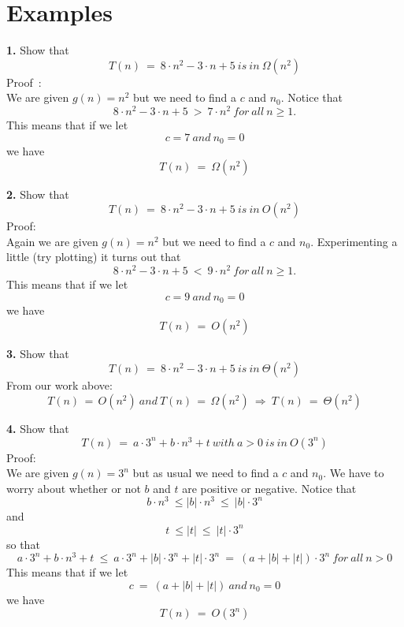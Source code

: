 
{\chapter{Examples}}




{\bf{1.}} Show that
\[
T(n) \ = \ 8{\cdot}n^2 - 3{\cdot}n + 5 \ {\mathit{is\ in}} \ \Omega(n^2)
\]
%
Proof~\cite{book-full}: \\
We are given $g(n) = n^2$ but we need to find a $c$ and $n_0$. Notice that
\[
8{\cdot}n^2 - 3{\cdot}n + 5 \ > \ 7{\cdot}n^2 \ {\mathit{for\ all}} \ n \ge 1.
\]
This means that if we let
\[
c = 7 \ {\mathit{and}} \ n_0 = 0
\]
we have
\[
T(n) \ = \ \Omega(n^2)
\]



\vspace*{2em}


{\bf{2.}} Show that
\[
T(n) \ = \ 8{\cdot}n^2 - 3{\cdot}n + 5 \ {\mathit{is\ in}} \ O(n^2)
\]
%
Proof: \\
Again we are given $g(n) = n^2$ but we need to find a $c$ and $n_0$.
Experimenting a little (try plotting) it turns out that
\[
8{\cdot}n^2 - 3{\cdot}n + 5 \ < \ 9{\cdot}n^2 \ {\mathit{for\ all}} \ n \ge 1.
\]
This means that if we let
\[
c = 9 \ {\mathit{and}} \ n_0 = 0
\]
we have
\[
T(n) \ = \ O(n^2)
\]



\vspace*{2em}


{\bf{3.}} Show that
\[
T(n) \ = \ 8{\cdot}n^2 - 3{\cdot}n + 5 \ {\mathit{is\ in}} \ \Theta(n^2)
\]
From our work above: \\
\[
T(n) \, = \, O(n^2) \ {\mathit{and}} \ T(n) \, = \, \Omega(n^2)
\ \Rightarrow \ T(n) \ = \ \Theta(n^2)
\]



\vspace*{2em}


{\bf{4.}} Show that
\[
T(n) \ = \ a{\cdot}3^n + b{\cdot}n^3 + t
\ {\mathit{with}} \ a > 0 \ {\mathit{is\ in}} \ O(3^n)
\]
%
Proof: \\
We are given $g(n) = 3^n$ but as usual we need to find a $c$ and $n_0$.
We have to worry about whether or not $b$ and $t$ are positive
or negative. Notice that
\[
b{\cdot}n^3 \ \le |b|{\cdot}n^3 \ \le \ |b|{\cdot}3^n
\]
and
\[
t \ \le |t| \ \le \ |t|{\cdot}3^n
\]
so that
\[
a{\cdot}3^n + b{\cdot}n^3 + t \ \le
\ a{\cdot}3^n + |b|{\cdot}3^n + |t|{\cdot}3^n
\ = \ (a + |b| + |t|){\cdot}3^n \ {\mathit{for\ all}} \ n > 0
\]
This means that if we let
\[
c \ = \ (a + |b| + |t|) \ {\mathit{and}} \ n_0 = 0
\]
we have
\[
T(n) \ = \ O(3^n)
\]



